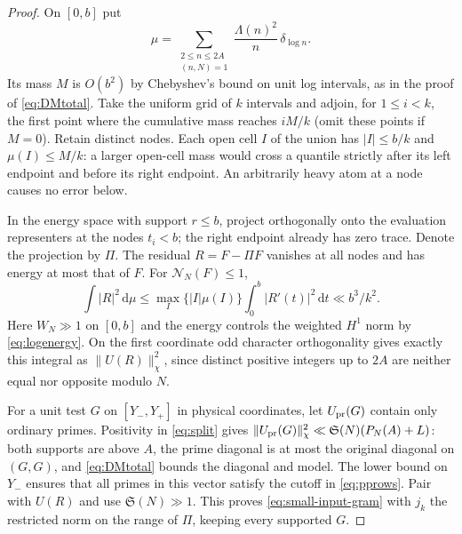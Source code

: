 \documentclass[11pt,a4paper]{article}
\numberwithin{equation}{section}
\newcommand{\SSS}{\mathfrak S}
\newcommand{\ud}{\mathrm d}
\newcommand{\NN}{\mathcal N_N}
\begin{document}
\begin{proof}
On $[0,b]$ put
\[
 \mu=\sum_{\substack{2\le n\le 2A\\(n,N)=1}}
          \frac{\Lambda(n)^2}{n}\,\delta_{\log n}.
\]
Its mass $M$ is $O(b^2)$ by Chebyshev's bound on unit log
intervals, as in the proof of \cref{eq:DMtotal}.
Take the uniform grid of $k$ intervals and adjoin, for
$1\le i<k$, the first point where the cumulative mass reaches
$iM/k$ (omit these points if $M=0$). Retain distinct nodes.
Each open cell $I$ of the union has $|I|\le b/k$ and
$\mu(I)\le M/k$: a larger open-cell mass would cross a quantile
strictly after its left endpoint and before its right endpoint.
An arbitrarily heavy atom at a node causes no error below.

In the energy space with support $r\le b$, project orthogonally
onto the evaluation representers at the nodes $t_i<b$; the
right endpoint already has zero trace. Denote the projection
by $\Pi$. The residual $R=F-\Pi F$ vanishes at all nodes and
has energy at most that of $F$. For $\NN(F)\le1$,
\[
 \int |R|^2\,\ud\mu
 \le \max_I\{|I|\mu(I)\}\int_0^b|R'(t)|^2\,\ud t
 \ll b^3/k^2 .
\]
Here $W_N\gg1$ on $[0,b]$ and the energy controls the weighted
$H^1$ norm by \eqref{eq:logenergy}. On the first coordinate odd
character orthogonality gives exactly this integral as
$\|U(R)\|_\chi^2$, since distinct positive integers up to $2A$
are neither equal nor opposite modulo $N$.

For a unit test $G$ on $[Y_-,Y_+]$ in physical coordinates,
let $U_{\rm pr}(G)$ contain only ordinary primes.
Positivity in \eqref{eq:split} gives
$\|U_{\rm pr}(G)\|_\chi^2\ll\SSS(N)(P_N(A)+L)$:
both supports are above $A$, the prime diagonal is at most the
original diagonal on $(G,G)$, and \eqref{eq:DMtotal} bounds the
diagonal and model. The lower bound on $Y_-$ ensures that all
primes in this vector satisfy the cutoff in \eqref{eq:pprows}.
Pair with $U(R)$ and use $\SSS(N)\gg1$. This proves
\eqref{eq:small-input-gram} with $j_k$ the restricted norm on
the range of $\Pi$, keeping every supported $G$.


\end{proof}
\end{document}
